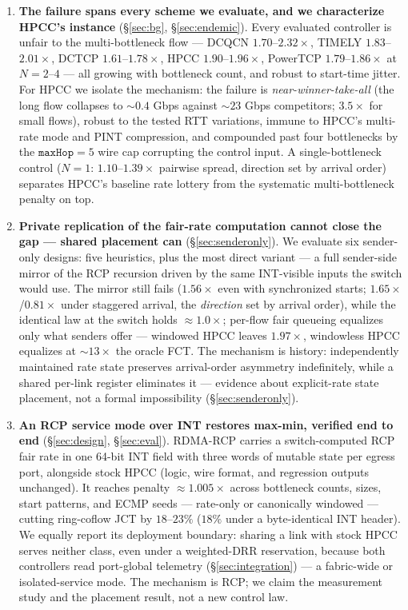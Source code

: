 \documentclass[sigconf, nonacm]{acmart}
\newcommand{\hpccfs}{\textsc{RDMA-RCP}\xspace}
\begin{document}
\begin{enumerate}
\item \textbf{The failure spans every scheme we evaluate, and we characterize HPCC's instance}
(\S\ref{sec:bg}, \S\ref{sec:endemic}). Every evaluated controller is unfair to the
multi-bottleneck flow --- DCQCN $1.70$--$2.32\times$, TIMELY $1.83$--$2.01\times$, DCTCP
$1.61$--$1.78\times$, HPCC $1.90$--$1.96\times$, PowerTCP $1.79$--$1.86\times$ at
$N = 2$--$4$ --- all growing with bottleneck count, and robust to start-time jitter. For HPCC we isolate the mechanism: the failure is
\emph{near-winner-take-all} (the long flow collapses to ${\sim}0.4$ Gbps against ${\sim}23$ Gbps
competitors; $3.5\times$ for small flows), robust to the tested RTT variations, immune to
HPCC's multi-rate mode
and PINT compression, and compounded past four bottlenecks by the $\texttt{maxHop}=5$ wire
cap corrupting the control input. A single-bottleneck
control ($N{=}1$: $1.10$--$1.39\times$ pairwise spread, direction set by arrival order)
separates HPCC's baseline rate lottery from the systematic multi-bottleneck penalty on top.

\item \textbf{Private replication of the fair-rate computation cannot close the gap ---
shared placement can} (\S\ref{sec:senderonly}). We evaluate six sender-only designs: five
heuristics, plus the most direct variant --- a full sender-side mirror of the RCP recursion
driven by the same INT-visible inputs the switch would use. The mirror still fails
($1.56\times$ even with synchronized starts; $1.65\times$/$0.81\times$ under staggered
arrival, the \emph{direction} set by arrival order), while the identical law at the switch
holds ${\approx}1.0\times$; per-flow fair queueing equalizes only what senders offer ---
windowed HPCC leaves $1.97\times$, windowless HPCC equalizes at ${\sim}13\times$ the oracle
FCT. The mechanism is history: independently maintained rate state preserves
arrival-order asymmetry indefinitely, while a shared per-link register eliminates it ---
evidence about explicit-rate state placement, not a formal impossibility
(\S\ref{sec:senderonly}).

\item \textbf{An RCP service mode over INT restores max-min, verified end to end}
(\S\ref{sec:design}, \S\ref{sec:eval}). \hpccfs carries a switch-computed RCP fair rate in one
64-bit INT field with three words of mutable state per egress port, alongside stock
HPCC (logic, wire format, and regression outputs unchanged). It reaches penalty ${\approx}1.005\times$ across bottleneck counts,
sizes, start patterns, and ECMP seeds --- rate-only or canonically windowed --- cutting
ring-coflow JCT by $18$--$23\%$ ($18\%$ under a byte-identical INT header). We equally report its deployment boundary: sharing a link with stock HPCC serves neither
class, even under a weighted-DRR reservation, because both controllers read port-global
telemetry (\S\ref{sec:integration}) --- a fabric-wide or isolated-service mode. The mechanism
is RCP; we claim the measurement study and the placement result, not a new control law.
\end{enumerate}
\end{document}
